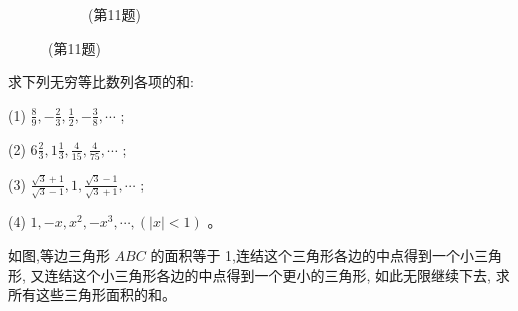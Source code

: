 \documentclass[lang=cn,newtx,12pt,scheme=chinese]{elegantbook}
\begin{document}
\begin{problemset}[习题一]
\begin{figure}[h]
\begin{subfigure}[h]{0.45\textwidth}
			\caption{	(第11题)}
		\end{subfigure}
	\end{figure}
	
	\item 求下列无穷等比数列各项的和:
	
	(1) \(\frac{8}{9}, - \frac{2}{3},\frac{1}{2}, - \frac{3}{8},\cdots\) ;
	
	(2) \(6\frac{2}{3},1\frac{1}{3},\frac{4}{15},\frac{4}{75},\cdots\) ;
	
	(3) \(\frac{\sqrt{3} + 1}{\sqrt{3} - 1},1,\frac{\sqrt{3} - 1}{\sqrt{3} + 1},\cdots\) ;
	
	(4) \(1, - x,{x}^{2}, - {x}^{3},\cdots ,\left( {\left| x\right| < 1}\right)\) 。
	
	\item 如图,等边三角形 \({ABC}\) 的面积等于 1,连结这个三角形各边的中点得到一个小三角形, 又连结这个小三角形各边的中点得到一个更小的三角形, 如此无限继续下去, 求所有这些三角形面积的和。
	

\end{problemset}
\end{document}
